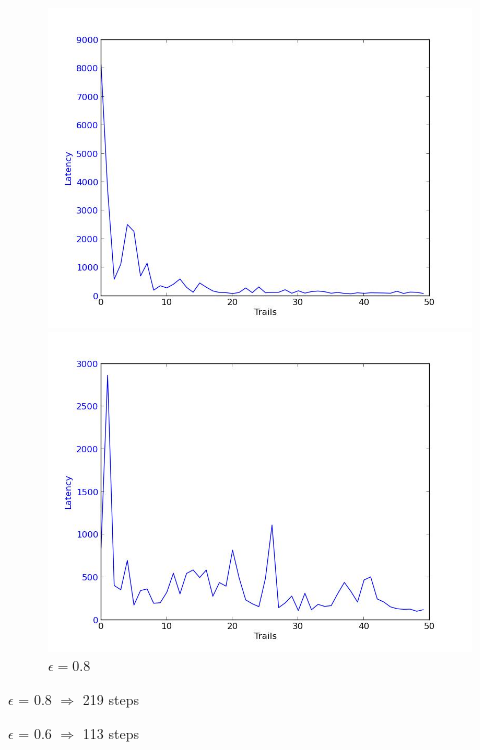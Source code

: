 \documentclass[a4paper, 11pt]{article}
\begin{document}
\begin{figure}
  \centering
  \begin{minipage}[c]{0.5\textwidth}
    \centering
    \includegraphics[scale=0.3]{../figure/eps6.jpeg}
  \caption{$\epsilon = 0.6$}
  \end{minipage}%
  \begin{minipage}[c]{0.5\textwidth}
    \centering
    \includegraphics[scale=0.3]{../figure/eps8.jpeg}
  \caption{$\epsilon = 0.8$}
  \end{minipage}
\end{figure}


$\epsilon$ = 0.8 $\Rightarrow$ 219 steps

$\epsilon$ = 0.6 $\Rightarrow$ 113 steps
\end{document}
